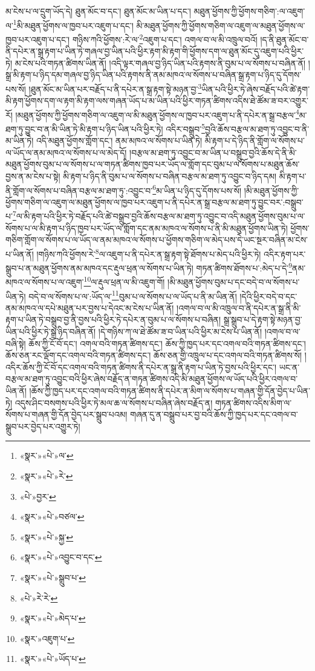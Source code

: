མ་ངེས་པ་ལ་དྲུག་ཡོད་དེ། ཐུན་མོང་བ་དང་། ཐུན་མོང་མ་ཡིན་པ་དང་། མཐུན་ཕྱོགས་ཀྱི་ཕྱོགས་གཅིག་:ལ་འཇུག་ལ་\footnote{«སྣར་»«པེ་»ལ་}མི་མཐུན་ཕྱོགས་ལ་ཁྱབ་པར་འཇུག་པ་དང་། མི་མཐུན་ཕྱོགས་ཀྱི་ཕྱོགས་གཅིག་ལ་འཇུག་ལ་མཐུན་ཕྱོགས་ལ་ཁྱབ་པར་འཇུག་པ་དང་། གཉིས་ཀའི་ཕྱོགས་:རེ་ལ་\footnote{«སྣར་»«པེ་»རེ་}འཇུག་པ་དང་། འགལ་བ་ལ་མི་འཁྲུལ་བའོ། །ད་ནི་ཐུན་མོང་བ་ནི་དཔེར་ན་སྒྲ་རྟག་པ་ཡིན་ཏེ་གཞལ་བྱ་ཡིན་པའི་ཕྱིར་རྟག་མི་རྟག་གི་ཕྱོགས་དག་ལ་ཐུན་མོང་དུ་འཇུག་པའི་ཕྱིར་ཏེ། མ་ངེས་པའི་གཏན་ཚིགས་ཡིན་ནོ། །འདི་ལྟར་གཞལ་བྱ་ཉིད་ཡིན་པའི་རྟགས་ནི་བུམ་པ་ལ་སོགས་པ་བཞིན་ནོ། །སྒྲ་མི་རྟག་པ་ཉིད་དམ་གཞལ་བྱ་ཉིད་ཡིན་པའི་རྟགས་ནི་ནམ་མཁའ་ལ་སོགས་པ་བཞིན་སྒྲ་རྟག་པ་ཉིད་དུ་དོགས་པས་སོ། །ཐུན་མོང་མ་ཡིན་པར་བརྗོད་པ་ནི་དཔེར་ན་སྒྲ་རྟག་སྟེ་མཉན་བྱ་\footnote{«པེ་»བྱར་}ཡིན་པའི་ཕྱིར་ཏེ་ཞེས་བརྗོད་པའི་ཚེ་རྟག་མི་རྟག་ཕྱོགས་དག་ལ་རྟག་མི་རྟག་ལས་གཞན་ཡོད་པ་མ་ཡིན་པའི་ཕྱིར་གཏན་ཚིགས་འདིས་ཐེ་ཚོམ་ཟ་བར་འགྱུར་རོ། །མཐུན་ཕྱོགས་ཀྱི་ཕྱོགས་གཅིག་ལ་འཇུག་ལ་མི་མཐུན་ཕྱོགས་ལ་ཁྱབ་པར་འཇུག་པ་ནི་དཔེར་ན་སྒྲ་བརྩལ་\footnote{«སྣར་»«པེ་»བཙལ་}མ་ཐག་ཏུ་བྱུང་བ་ན་མི་ཡིན་ཏེ་མི་རྟག་པ་ཉིད་ཡིན་པའི་ཕྱིར་ཏེ། འདིར་བསྒྲུབ་\footnote{«སྣར་»«པེ་»སྐྱ་}བྱའི་ཆོས་བརྩལ་མ་ཐག་ཏུ་འབྱུང་བ་ནི་མ་ཡིན་ཏེ། འདི་མཐུན་ཕྱོགས་གློག་དང་། ནམ་མཁའ་ལ་སོགས་པ་ཡིན་ཏེ། མི་རྟག་པ་དེ་ཉིད་ནི་གློག་ལ་སོགས་པ་ལ་ཡོད་ལ་ནམ་མཁའ་ལ་སོགས་པ་ལ་མེད་དོ། །བརྩལ་མ་ཐག་ཏུ་འབྱུང་བ་མ་ཡིན་པ་བསྒྲུབ་བྱའི་ཆོས་དེ་ནི་མི་མཐུན་ཕྱོགས་བུམ་པ་ལ་སོགས་པ་ལ་གཏན་ཚིགས་ཁྱབ་པར་ཡོད་ལ་གློག་དང་བུམ་པ་ལ་སོགས་པ་མཐུན་ཆོས་བྱས་ན་མ་ངེས་པ་སྟེ། མི་རྟག་པ་ཉིད་ནི་བུམ་པ་ལ་སོགས་པ་བཞིན་བརྩལ་མ་ཐག་ཏུ་འབྱུང་བ་ཉིད་དམ། མི་རྟག་པ་ནི་གློག་ལ་སོགས་པ་བཞིན་བརྩལ་མ་ཐག་ཏུ་:འབྱུང་བ་\footnote{«སྣར་»«པེ་»འབྱུང་བ་དང་}མ་ཡིན་པ་ཉིད་དུ་དོགས་པས་སོ། །མི་མཐུན་ཕྱོགས་ཀྱི་ཕྱོགས་གཅིག་ལ་འཇུག་ལ་མཐུན་ཕྱོགས་ལ་ཁྱབ་པར་འཇུག་པ་ནི་དཔེར་ན་སྒྲ་བརྩལ་མ་ཐག་ཏུ་བྱུང་བར་:བསྒྲུབ་པ་\footnote{«སྣར་»«པེ་»སྒྲུབ་པ་}ལ་མི་རྟག་པའི་ཕྱིར་ཏེ་བརྗོད་པའི་ཚེ་བསྒྲུབ་བྱའི་ཆོས་བརྩལ་མ་ཐག་ཏུ་འབྱུང་བ་འདི་མཐུན་ཕྱོགས་བུམ་པ་ལ་སོགས་པ་ལ་མི་རྟག་པ་ཉིད་ཁྱབ་པར་ཡོད་ལ་གློག་དང་ནམ་མཁའ་ལ་སོགས་པ་ནི་མི་མཐུན་ཕྱོགས་ཡིན་ཏེ། ཕྱོགས་གཅིག་གློག་ལ་སོགས་པ་ལ་ཡོད་ལ་ནམ་མཁའ་ལ་སོགས་པ་ཕྱོགས་གཅིག་ལ་མེད་པས་དེ་ཡང་སྔར་བཞིན་མ་ངེས་པ་ཡིན་ནོ། །གཉིས་ཀའི་ཕྱོགས་རེ་\footnote{«པེ་»རེ་རེ་}ལ་འཇུག་པ་ནི་དཔེར་ན་སྒྲ་རྟག་སྟེ་ཐོགས་པ་མེད་པའི་ཕྱིར་ཏེ། འདིར་རྟག་པར་སྒྲུབ་པ་ན་མཐུན་ཕྱོགས་ནམ་མཁའ་དང་རྡུལ་ཕྲན་ལ་སོགས་པ་ཡིན་ཏེ། གཏན་ཚིགས་ཐོགས་པ་:མེད་པ་དེ་\footnote{«སྣར་»«པེ་»མེད་པ་}ནམ་མཁའ་ལ་སོགས་པ་ལ་འཇུག་\footnote{«སྣར་»འཇུག་པ་}ལ་རྡུལ་ཕྲན་ལ་མི་འཇུག་གོ། །མི་མཐུན་ཕྱོགས་བུམ་པ་དང་བདེ་བ་ལ་སོགས་པ་ཡིན་ཏེ། བདེ་བ་ལ་སོགས་པ་ལ་:ཡོད་ལ་\footnote{«སྣར་»«པེ་»ཡོད་པ་}བུམ་པ་ལ་སོགས་པ་ལ་ཡོད་པ་ནི་མ་ཡིན་ནོ། །དེའི་ཕྱིར་བདེ་བ་དང་ནམ་མཁའ་ལ་དཔེ་མཐུན་པར་བྱས་པ་དེའང་མ་ངེས་པ་ཡིན་ནོ། །འགལ་བ་ལ་མི་འཁྲུལ་བ་ནི་དཔེར་ན་སྒྲ་ནི་མི་རྟག་པ་ཡིན་ཏེ་བསྒྲུབ་བྱ་ནི་བྱས་པའི་ཕྱིར་ཏེ་དཔེར་ན་བུམ་པ་ལ་སོགས་པ་བཞིན། སྒྲ་སྒྲུབ་པ་དེ་རྟག་སྟེ་མཉན་བྱ་ཡིན་པའི་ཕྱིར་ཏེ་སྒྲ་ཉིད་བཞིན་ནོ། །དེ་གཉིས་ཀ་ལ་ཐེ་ཚོམ་ཟ་བ་ཡིན་པའི་ཕྱིར་མ་ངེས་པ་ཡིན་ནོ། །འགལ་བ་ལ་བཞི་སྟེ། ཆོས་ཀྱི་ངོ་བོ་དང་། འགལ་བའི་གཏན་ཚིགས་དང་། ཆོས་ཀྱི་ཁྱད་པར་དང་འགལ་བའི་གཏན་ཚིགས་དང་། ཆོས་ཅན་རང་ལྡོག་དང་འགལ་བའི་གཏན་ཚིགས་དང་། ཆོས་ཅན་གྱི་འཁྲུལ་པ་དང་འགལ་བའི་གཏན་ཚིགས་སོ། །འདིར་ཆོས་ཀྱི་ངོ་བོ་དང་འགལ་བའི་གཏན་ཚིགས་ནི་དཔེར་ན་སྒྲ་ནི་རྟག་པ་ཡིན་ཏེ་བྱས་པའི་ཕྱིར་དང་། ཡང་ན་བརྩལ་མ་ཐག་ཏུ་འབྱུང་བའི་ཕྱིར་ཞེས་བརྗོད་ན་གཏན་ཚིགས་འདི་མི་མཐུན་ཕྱོགས་ལ་ཡོད་པའི་ཕྱིར་འགལ་བ་ཡིན་ནོ། །ཆོས་ཀྱི་ཁྱད་པར་དང་འགལ་བའི་གཏན་ཚིགས་ནི་དཔེར་ན་མིག་ལ་སོགས་པ་གཞན་གྱི་དོན་བྱེད་པ་ཡིན་ཏེ། འདུས་ཤིང་བསགས་པའི་ཕྱིར་ཏེ་མལ་ཆ་ལ་སོགས་པ་བཞིན་ཞེས་བརྗོད་ན། གཏན་ཚིགས་འདིས་མིག་ལ་སོགས་པ་གཞན་གྱི་དོན་བྱེད་པར་སྒྲུབ་པའམ། གཞན་དུ་ན་བསྒྲུབ་པར་བྱ་བའི་ཆོས་ཀྱི་ཁྱད་པར་དང་འགལ་བ་སྒྲུབ་པར་བྱེད་པར་འགྱུར་ཏེ། 